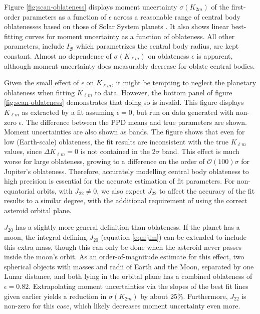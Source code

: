 \documentclass[fleqn,usenatbib]{mnras}
\begin{document}
Figure \ref{fig:scan-oblateness} displays moment uncertainty $\sigma(K_{2 m})$ of the first-order parameters as a function of $\epsilon$ across a reasonable range of central body oblatenesses based on those of Solar System planets \citep{paterLissauer2015}. It also shows linear best-fitting curves for moment uncertainty as a function of oblateness. All other parameters, include $I_\mathcal{B}$ which parametrizes the central body radius, are kept constant. Almost no dependence of $\sigma(K_{\ell m})$ on oblateness $\epsilon$ is apparent, although moment uncertainty does measurably decrease for oblate central bodies.

Given the small effect of $\epsilon$ on $K_{\ell m}$, it might be tempting to neglect the planetary oblateness when fitting $K_{\ell m}$ to data. However, the bottom panel of figure \ref{fig:scan-oblateness} demonstrates that doing so is invalid. This figure displays $K_{\ell m}$ as extracted by a fit assuming $\epsilon = 0$, but run on data generated with non-zero $\epsilon$. The difference between the PPD means and true parameters are shown. Moment uncertainties are also shown as bands. The figure shows that even for low (Earth-scale) oblateness, the fit results are inconsistent with the true $K_{\ell m}$ values, since $\Delta K_{\ell m} = 0$ is not contained in the 2$\sigma$ band. This effect is much worse for large oblateness, growing to a difference on the order of $\mathcal{O}(100)\sigma$ for Jupiter's oblateness. Therefore, accurately modelling central body oblateness to high precision is essential for the accurate estimation of fit parameters. For non-equatorial orbits, with $J_{22} \neq 0$, we also expect $J_{22}$ to affect the accuracy of the fit results to a similar degree, with the additional requirement of using the correct asteroid orbital plane.

$J_{20}$ has a slightly more general definition than oblateness. If the planet has a moon, the integral defining $J_{20}$ (equation \ref{eqn:jlm}) can be extended to include this extra mass, though this can only be done when the asteroid never passes inside the moon's orbit. As an order-of-magnitude estimate for this effect, two spherical objects with masses and radii of Earth and the Moon, separated by one Lunar distance, and both lying in the orbital plane has a combined oblateness of $\epsilon = 0.82$. Extrapolating moment uncertainties via the slopes of the best fit lines given earlier yields a reduction in $\sigma(K_{2m})$ by about 25\%. Furthermore, $J_{22}$ is non-zero for this case, which likely decreases moment uncertainty even more.
\end{document}
